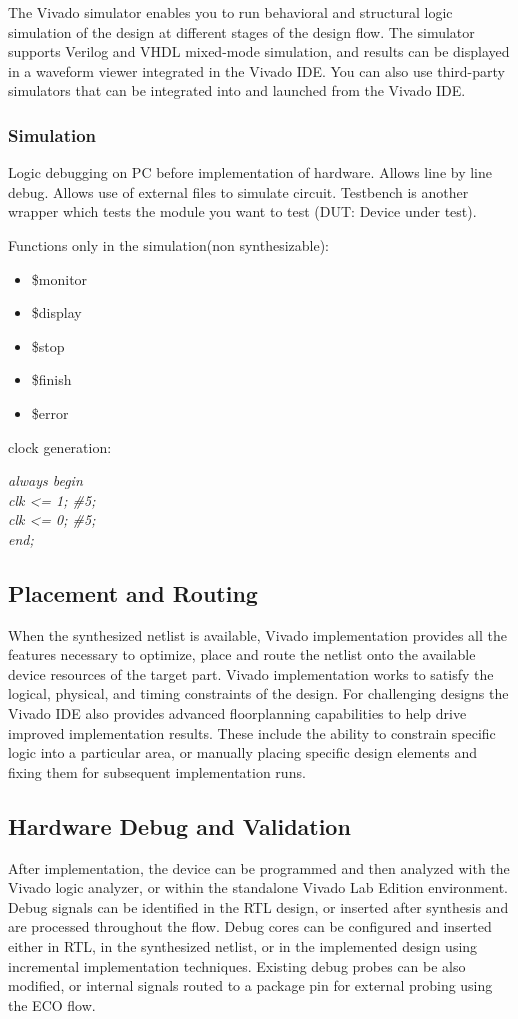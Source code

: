 The Vivado simulator enables you to run behavioral and structural logic simulation of the design at different stages of the design flow. The simulator supports Verilog and VHDL mixed-mode simulation, and results can be displayed in a waveform viewer integrated in the Vivado IDE. You can also use third-party simulators that can be integrated into and launched from the Vivado IDE.

\subsubsection{Simulation}
 Logic debugging on PC before implementation of hardware. Allows line by line debug. Allows use of external files to simulate circuit. Testbench is another wrapper which tests the module you want to test (DUT: Device under test).

Functions only in the simulation(non synthesizable): 
\begin{itemize}
	\item \$monitor
	\item \$display
	\item \$stop
	\item \$finish
	\item \$error
\end{itemize}

clock generation:

\textit {always begin \\
	clk <= 1; \#5; \\
	clk <= 0; \#5; \\
	end;}
	

\subsection{Placement and Routing}
When the synthesized netlist is available, Vivado implementation provides all the features necessary to optimize, place and route the netlist onto the available device resources of the target part. Vivado implementation works to satisfy the logical, physical, and timing constraints of the design. For challenging designs the Vivado IDE also provides advanced floorplanning capabilities to help drive improved implementation results. These include the ability to constrain specific logic into a particular area, or manually placing specific design elements and fixing them for subsequent implementation runs. 

\subsection{Hardware Debug and Validation}
After implementation, the device can be programmed and then analyzed with the Vivado logic analyzer, or within the standalone Vivado Lab Edition environment. Debug signals can be identified in the RTL design, or inserted after synthesis and are processed throughout the flow. Debug cores can be configured and inserted either in RTL, in the synthesized netlist, or in the implemented design using incremental implementation techniques. Existing debug probes can be also modified, or internal signals routed to a package pin for external probing using the ECO flow. 

